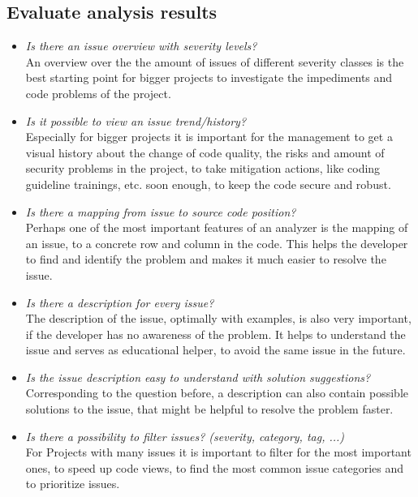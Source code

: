 \documentclass[conference]{IEEEtran}
\begin{document}
\subsection{Evaluate analysis results}
\begin{itemize}
	\item \textit{Is there an issue overview with severity levels?} \\
	An overview over the the amount of issues of different severity classes is the best starting point for bigger projects to investigate the impediments and code problems of the project.
	
	\item \textit{Is it possible to view an issue trend/history?} \\
	Especially for bigger projects it is important for the management to get a visual history about the change of code quality, the risks and amount of security problems in the project, to take mitigation actions, like coding guideline trainings, etc. soon enough, to keep the code secure and robust.	
	
	\item \textit{Is there a mapping from issue to source code position?} \\
	Perhaps one of the most important features of an analyzer is the mapping of an issue, to a concrete row and column in the code.
	This helps the developer to find and identify the problem and makes it much easier to resolve the issue.
	
	\item \textit{Is there a description for every issue?} \\
	The description of the issue, optimally with examples, is also very important, if the developer has no awareness of the problem.
	It helps to understand the issue and serves as educational helper, to avoid the same issue in the future.
	
	\item \textit{Is the issue description easy to understand with solution suggestions?} \\
	Corresponding to the question before, a description can also contain possible solutions to the issue, that might be helpful to resolve the problem faster.
	
	\item \textit{Is there a possibility to filter issues? (severity, category, tag, ...)} \\
	For Projects with many issues it is important to filter for the most important ones, to speed up code views, to find the most common issue categories and to prioritize issues.
\end{itemize}
\end{document}
